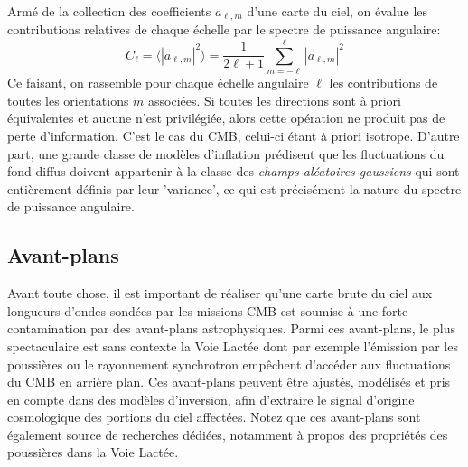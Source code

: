 Armé de la collection des coefficients $a_{\ell,m}$ d'une carte du ciel, on évalue les contributions relatives de chaque échelle par le spectre de puissance angulaire:
\begin{equation}
C_\ell=\langle |a_{\ell,m}|^2\rangle=\frac{1}{2\ell+1}\sum_{m=-\ell}^{\ell} |a_{\ell,m}|^2
\end{equation}
Ce faisant, on rassemble pour chaque échelle angulaire $\ell$ les contributions de toutes les orientations $m$ associées. Si toutes les directions sont à priori équivalentes et aucune n'est privilégiée, alors cette opération ne produit pas de perte d'information. C'est le cas du CMB, celui-ci étant à priori isotrope. D'autre part, une grande classe de modèles d'inflation prédisent que les fluctuations du fond diffus doivent appartenir à la classe des \textit{champs aléatoires gaussiens} qui sont entièrement définis par leur 'variance', ce qui est précisément la nature du spectre de puissance angulaire.

\subsection{Avant-plans}

Avant toute chose, il est important de réaliser qu'une carte brute du ciel aux longueurs d'ondes sondées par les missions CMB est soumise à une forte contamination par des avant-plans astrophysiques. Parmi ces avant-plans, le plus spectaculaire est sans contexte la Voie Lactée dont par exemple l'émission  par les poussières ou le rayonnement synchrotron empêchent d'accéder aux fluctuations du CMB en arrière plan. Ces avant-plans peuvent être ajustés, modélisés et pris en compte dans des modèles d'inversion, afin d'extraire le signal d'origine cosmologique des portions du ciel affectées. Notez que ces avant-plans sont également source de recherches dédiées, notamment à propos des propriétés des poussières dans la Voie Lactée.

